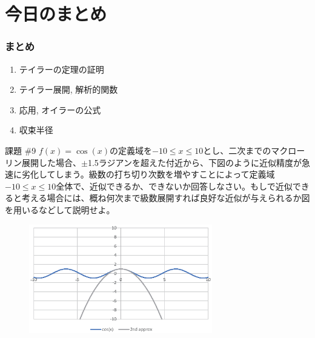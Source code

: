 \section{今日のまとめ}
\begin{frame}
\frametitle{まとめ}   


\begin{enumerate}
\item テイラーの定理の証明
\item テイラー展開, 解析的関数
\item 応用, オイラーの公式
\item 収束半径
\end{enumerate} 

\end{frame}
\begin{slide}{課題 \#9}
$f(x)=\cos(x)$の定義域を$-10 \le x \le 10$とし、二次までのマクローリン展開した場合、$\pm$1.5ラジアンを超えた付近から、下図のように近似精度が急速に劣化してしまう。級数の打ち切り次数を増やすことによって定義域$-10 \le x \le 10$全体で、近似できるか、できないか回答しなさい。もしで近似できると考える場合には、概ね何次まで級数展開すれば良好な近似が与えられるか図を用いるなどして説明せよ。

\begin{figure}[h]
\includegraphics[width=8cm]{calculus9/roccos.eps}
\end{figure}


\end{slide}

